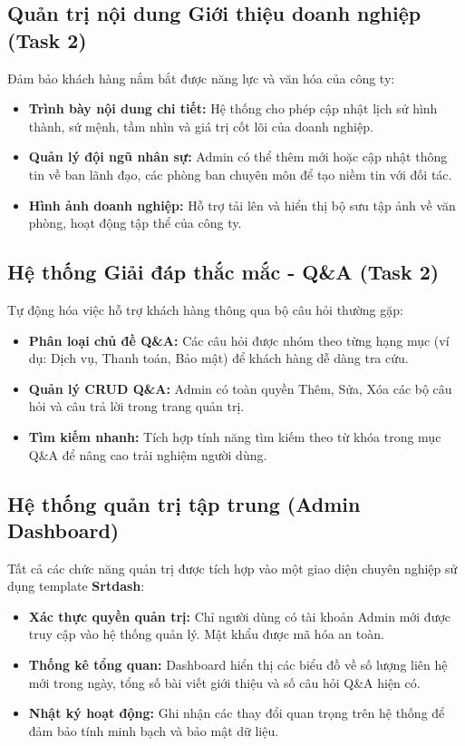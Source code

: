 \subsection{Quản trị nội dung Giới thiệu doanh nghiệp (Task 2)}
Đảm bảo khách hàng nắm bắt được năng lực và văn hóa của công ty:
\begin{itemize}
    \item \textbf{Trình bày nội dung chi tiết:} Hệ thống cho phép cập nhật lịch sử hình thành, sứ mệnh, tầm nhìn và giá trị cốt lõi của doanh nghiệp.
    \item \textbf{Quản lý đội ngũ nhân sự:} Admin có thể thêm mới hoặc cập nhật thông tin về ban lãnh đạo, các phòng ban chuyên môn để tạo niềm tin với đối tác.
    \item \textbf{Hình ảnh doanh nghiệp:} Hỗ trợ tải lên và hiển thị bộ sưu tập ảnh về văn phòng, hoạt động tập thể của công ty.
\end{itemize}

\subsection{Hệ thống Giải đáp thắc mắc - Q\&A (Task 2)}
Tự động hóa việc hỗ trợ khách hàng thông qua bộ câu hỏi thường gặp:
\begin{itemize}
    \item \textbf{Phân loại chủ đề Q\&A:} Các câu hỏi được nhóm theo từng hạng mục (ví dụ: Dịch vụ, Thanh toán, Bảo mật) để khách hàng dễ dàng tra cứu.
    \item \textbf{Quản lý CRUD Q\&A:} Admin có toàn quyền Thêm, Sửa, Xóa các bộ câu hỏi và câu trả lời trong trang quản trị.
    \item \textbf{Tìm kiếm nhanh:} Tích hợp tính năng tìm kiếm theo từ khóa trong mục Q\&A để nâng cao trải nghiệm người dùng.
\end{itemize}

\subsection{Hệ thống quản trị tập trung (Admin Dashboard)}
Tất cả các chức năng quản trị được tích hợp vào một giao diện chuyên nghiệp sử dụng template \textbf{Srtdash}:
\begin{itemize}
    \item \textbf{Xác thực quyền quản trị:} Chỉ người dùng có tài khoản Admin mới được truy cập vào hệ thống quản lý. Mật khẩu được mã hóa an toàn.
    \item \textbf{Thống kê tổng quan:} Dashboard hiển thị các biểu đồ về số lượng liên hệ mới trong ngày, tổng số bài viết giới thiệu và số câu hỏi Q\&A hiện có.
    \item \textbf{Nhật ký hoạt động:} Ghi nhận các thay đổi quan trọng trên hệ thống để đảm bảo tính minh bạch và bảo mật dữ liệu.
\end{itemize}
